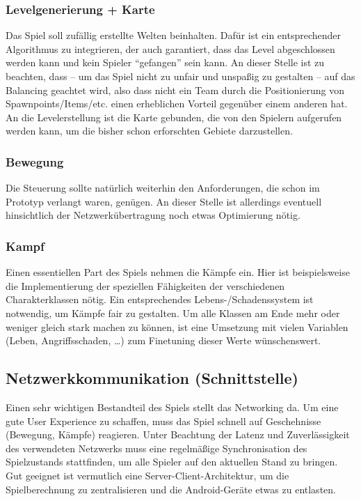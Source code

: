 \documentclass[10pt,a4paper,notitlepage]{report}
\begin{document}
\begin{flushleft}
\subsubsection{Levelgenerierung + Karte}
Das Spiel soll zufällig erstellte Welten beinhalten. Dafür ist ein entsprechender Algorithmus zu integrieren, der auch garantiert, dass das Level abgeschlossen werden kann und kein Spieler \enquote{gefangen} sein kann. An dieser Stelle ist zu beachten, dass – um das Spiel nicht zu unfair und unspaßig zu gestalten – auf das Balancing geachtet wird, also dass nicht ein Team durch die Positionierung von Spawnpoints/Items/etc. einen erheblichen Vorteil gegenüber einem anderen hat. An die Levelerstellung ist die Karte gebunden, die von den Spielern aufgerufen werden kann, um die bisher schon erforschten Gebiete darzustellen.

\subsubsection{Bewegung}
Die Steuerung sollte natürlich weiterhin den Anforderungen, die schon im Prototyp verlangt waren, genügen. An dieser Stelle ist allerdings eventuell hinsichtlich der Netzwerkübertragung noch etwas Optimierung nötig. 

\subsubsection{Kampf} 
Einen essentiellen Part des Spiels nehmen die Kämpfe ein. Hier ist beispielsweise die Implementierung der speziellen Fähigkeiten der verschiedenen Charakterklassen nötig. Ein entsprechendes Lebens-/Schadenssystem ist notwendig, um Kämpfe fair zu gestalten. Um alle Klassen am Ende mehr oder weniger gleich stark machen zu können, ist eine Umsetzung mit vielen Variablen (Leben, Angriffsschaden, …) zum Finetuning dieser Werte wünschenswert. 

\subsection{Netzwerkkommunikation (Schnittstelle)}
Einen sehr wichtigen Bestandteil des Spiels stellt das Networking da. Um eine gute User Experience zu schaffen, muss das Spiel schnell auf Geschehnisse (Bewegung, Kämpfe) reagieren. Unter Beachtung der Latenz und Zuverlässigkeit des verwendeten Netzwerks muss eine regelmäßige Synchronisation des Spielzustands stattfinden, um alle Spieler auf den aktuellen Stand zu bringen. Gut geeignet ist vermutlich eine Server-Client-Architektur, um die Spielberechnung zu zentralisieren und die Android-Geräte etwas zu entlasten. 


\end{flushleft}
\end{document}
